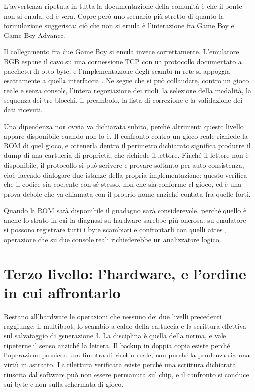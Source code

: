 L'avvertenza ripetuta in tutta la documentazione della comunità è che il ponte non si emula, ed è vera. Copre però uno scenario più stretto di quanto la formulazione suggerisca: ciò che non si emula è l'interazione fra Game Boy e Game Boy Advance.

Il collegamento fra due Game Boy si emula invece correttamente. L'emulatore BGB espone il cavo su una connessione TCP con un protocollo documentato a pacchetti di otto byte, e l'implementazione degli scambi in rete si appoggia esattamente a quella interfaccia \cite{gambatte-gamelink,pokemongb-online}. Ne segue che si può collaudare, contro un gioco reale e senza console, l'intera negoziazione dei ruoli, la selezione della modalità, la sequenza dei tre blocchi, il preambolo, la lista di correzione e la validazione dei dati ricevuti.

Una dipendenza non ovvia va dichiarata subito, perché altrimenti questo livello appare disponibile quando non lo è. Il confronto contro un gioco reale richiede la ROM di quel gioco, e ottenerla dentro il perimetro dichiarato significa produrre il dump di una cartuccia di proprietà, che richiede il lettore. Finché il lettore non è disponibile, il protocollo si può scrivere e provare soltanto per auto-consistenza, cioè facendo dialogare due istanze della propria implementazione: questo verifica che il codice sia coerente con sé stesso, non che sia conforme al gioco, ed è una prova debole che va chiamata con il proprio nome anziché contata fra quelle forti.

Quando la ROM sarà disponibile il guadagno sarà considerevole, perché quello è anche lo strato in cui la diagnosi su hardware sarebbe più onerosa: su emulatore si possono registrare tutti i byte scambiati e confrontarli con quelli attesi, operazione che su due console reali richiederebbe un analizzatore logico.

\section{Terzo livello: l'hardware, e l'ordine in cui affrontarlo}

Restano all'hardware le operazioni che nessuno dei due livelli precedenti raggiunge: il multiboot, lo scambio a caldo della cartuccia e la scrittura effettiva sul salvataggio di generazione 3. La disciplina è quella della norma, e vale ripeterne il senso anziché la lettera. Il backup in doppia copia esiste perché l'operazione possiede una finestra di rischio reale, non perché la prudenza sia una virtù in astratto. La rilettura verificata esiste perché una scrittura dichiarata riuscita dal software può non essere permanuta sul chip, e il confronto si conduce sui byte e non sulla schermata di gioco.

